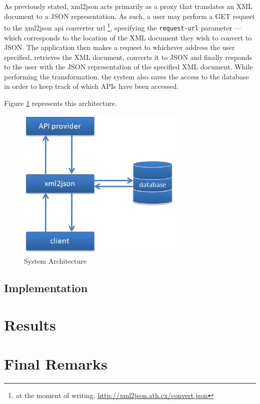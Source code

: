 \documentclass[twocolumn,twoside,10pt,a4paper]{article}
\begin{document}
As previously stated, xml2json acts primarily as a proxy that translates an XML document to a JSON representation. As such, a user may perform a GET request to the xml2json api converter url \footnote{at the moment of writing, \url{http://xml2json.ath.cx/convert.json}}, specifying the \verb!request-url! parameter --- which corresponds to the location of the XML document they wish to convert to JSON. The application then makes a request to whichever address the user specified, retrieves the XML document, converts it to JSON and finally responds to the user with the JSON representation of the specified XML document. While performing the transformation, the system also saves the access to the database in order to keep track of which APIs have been accessed.

Figure \ref{fig:system_arch} represents this architecture.

\begin{figure}[h]
    \centering
    \includegraphics[width=80mm]{images/arch.png}
    \caption{System Architecture}
    \label{fig:system_arch}
\end{figure}

\subsection{Implementation}\label{sec:implementation}


\section{Results}\label{sec:results}

\section{Final Remarks}\label{sec:final-remarks}

\renewcommand{\bibname}{References}


\end{document}
